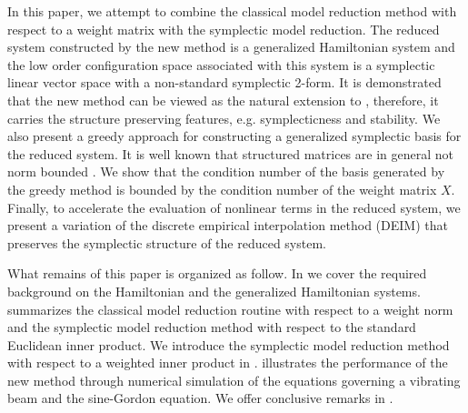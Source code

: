 In this paper, we attempt to combine the classical model reduction method with respect to a weight matrix with the symplectic model reduction. The reduced system constructed by the new method is a generalized Hamiltonian system and the low order configuration space associated with this system is a symplectic linear vector space with a non-standard symplectic 2-form. It is demonstrated that the new method can be viewed as the natural extension to \cite{doi:10.1137/17M1111991}, therefore, it carries the structure preserving features, e.g. symplecticness and stability. We also present a greedy approach for constructing a generalized symplectic basis for the reduced system. It is well known that structured matrices are in general not norm bounded \cite{Karow:2006cf}. We show that the condition number of the basis generated by the greedy method is bounded by the condition number of the weight matrix $X$. Finally, to accelerate the evaluation of nonlinear terms in the reduced system, we present a variation of the discrete empirical interpolation method (DEIM) that preserves the symplectic structure of the reduced system.

What remains of this paper is organized as follow. In  we cover the required background on the Hamiltonian and the generalized Hamiltonian systems.  summarizes the classical model reduction routine with respect to a weight norm and the symplectic model reduction method with respect to the standard Euclidean inner product. We introduce the symplectic model reduction method with respect to a weighted inner product in .  illustrates the performance of the new method through numerical simulation of the equations governing a vibrating beam and the sine-Gordon equation. We offer conclusive remarks in .

